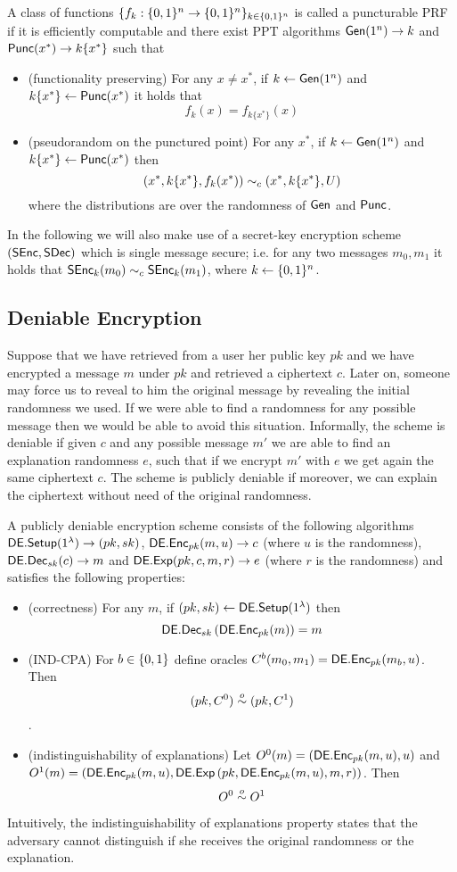 \begin{mydef}
A class of functions $\{f_k:\{0,1\}^n\to\{0,1\}^n\}_{k\in\{0,1\}^n}$ is called a puncturable PRF if it is efficiently computable and there exist PPT algorithms $\mathsf{Gen}(1^n)\to k$ and $\mathsf{Punc}(x^*)\to k\{x^*\}$ such that
\begin{itemize}
\item (functionality preserving) For any $x\ne x^*$, if $k\gets\mathsf{Gen}(1^n)$ and $k\{x^*\}\gets\mathsf{Punc}(x^*)$ it holds that
\[
f_k(x)=f_{k\{x^*\}}(x)
\]
\item (pseudorandom on the punctured point) For any $x^*$, if $k\gets\mathsf{Gen}(1^n)$ and $k\{x^*\}\gets\mathsf{Punc}(x^*)$ then
\[
\left(x^*,k\{x^*\},f_k(x^*)\right)\sim_c \left(x^*,k\{x^*\},U\right)
\]
where the distributions are over the randomness of $\mathsf{Gen}$ and $\mathsf{Punc}$.
\end{itemize}
\end{mydef}

In the following we will also make use of a secret-key encryption scheme $(\mathsf{SEnc},\mathsf{SDec})$ which is single message secure; i.e. for any two messages $m_0,m_1$ it holds that $\mathsf{SEnc}_k(m_0)\sim_c\mathsf{SEnc}_k(m_1)$, where $k\gets\{0,1\}^n$.


\subsection{Deniable Encryption}
Suppose that we have retrieved from a user her public key $pk$ and we have encrypted a message $m$ under $pk$ and retrieved a ciphertext $c$. Later on, someone may force us to reveal to him the original message by revealing the initial randomness we used. If we were able to find a randomness for any possible message then we would be able to avoid this situation. Informally, the scheme is deniable if given $c$ and any possible message $m'$ we are able to find an explanation randomness $e$, such that if we encrypt $m'$ with $e$ we get again the same ciphertext $c$. The scheme is publicly deniable if moreover, we can explain the ciphertext without need of the original randomness.

\begin{mydef}
A publicly deniable encryption scheme consists of the following algorithms $\mathsf{DE.Setup}(1^\lambda)\to(pk,sk)$, $\mathsf{DE.Enc}_{pk}(m,u)\to c$ (where $u$ is the randomness), $\mathsf{DE.Dec}_{sk}(c)\to m$ and $\mathsf{DE.Exp}(pk,c,m,r)\to e$ (where $r$ is the randomness) and satisfies the following properties:
\begin{itemize}
\item (correctness) For any $m$, if $(pk,sk)\gets \mathsf{DE.Setup}(1^\lambda)$ then
\[
\mathsf{DE.Dec}_{sk}\left(\mathsf{DE.Enc}_{pk}(m)\right)=m
\]
\item (IND-CPA) For $b\in\{0,1\}$ define oracles $C^b(m_0,m_1)=\mathsf{DE.Enc}_{pk}(m_b,u)$. Then $$(pk,C^0)\overset{o}{\sim}(pk,C^1)$$.
\item (indistinguishability of explanations) Let $O^0(m)=\left(\mathsf{DE.Enc}_{pk}(m,u),u\right)$ and $O^1(m)=\left(\mathsf{DE.Enc}_{pk}(m,u),\mathsf{DE.Exp}\left(pk,\mathsf{DE.Enc}_{pk}(m,u),m,r\right)\right)$. Then
\[
O^0\overset{o}{\sim} O^1
\]
\end{itemize}
\end{mydef}
Intuitively, the indistinguishability of explanations property states that the adversary cannot distinguish if she receives the original randomness or the explanation.

